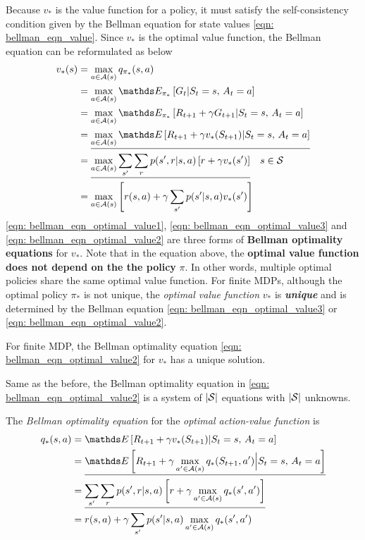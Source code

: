 \documentclass[11pt]{article}
\begin{document}
Because $v_{*}$ is the value function for a policy, it must satisfy the self-consistency condition given by the Bellman equation for state values \eqref{eqn: bellman_eqn_value}. Since $v_{*}$ is the optimal value function, the Bellman equation can be reformulated as below
\begin{align}
v_{*}(s)&= \max_{a\in \cA(s)}q_{\pi_{*}}(s, a) \nonumber\\
&= \max_{a\in \cA(s)}\E{\pi_{*}}{G_{t} | S_{t}=s, \, A_{t}=a} \nonumber\\
&= \max_{a\in \cA(s)}\E{\pi_{*}}{R_{t+1} + \gamma G_{t+1} | S_{t}=s, \, A_{t}=a} \nonumber\\
&= \underline{\max_{a\in \cA(s)}\E{}{R_{t+1} + \gamma v_{*}(S_{t+1}) | S_{t}=s, \, A_{t}=a}} \label{eqn: bellman_eqn_optimal_value1}\\
&= \underline{\max_{a\in \cA(s)}\sum_{s'}\sum_{r}p(s', r|s, a)\brac{r + \gamma v_{*}(s')}} \quad s\in \cS \label{eqn: bellman_eqn_optimal_value2}\\
&= \max_{a\in \cA(s)}\brac{r(s, a) + \gamma \sum_{s'}p(s'|s, a)v_{*}(s')} \label{eqn: bellman_eqn_optimal_value3}
\end{align}  \eqref{eqn: bellman_eqn_optimal_value1}, \eqref{eqn: bellman_eqn_optimal_value3} and  \eqref{eqn: bellman_eqn_optimal_value2} are three forms of \textbf{Bellman optimality equations} for $v_{*}$. Note that in the equation above, the \textbf{optimal value function does not depend on the the policy} $\pi$. In other words, multiple optimal policies share the same optimal value function. For finite MDPs, although the optimal policy $\pi_{*}$ is not unique, the \emph{optimal value function} $v_{*}$ is \emph{\textbf{unique}} and is determined by the Bellman equation  \eqref{eqn: bellman_eqn_optimal_value3} or \eqref{eqn: bellman_eqn_optimal_value2}.

\begin{theorem}
For finite MDP, the Bellman optimality equation \eqref{eqn: bellman_eqn_optimal_value2} for $v_{*}$ has a unique solution. 
\end{theorem} Same as the before, the Bellman optimality equation in \eqref{eqn: bellman_eqn_optimal_value2} is a system of $|{\mathcal S}|$ equations with $|{\mathcal S}|$ unknowns. 

The \emph{Bellman optimality equation} for the \emph{optimal action-value function} is 
\begin{align}
q_{*}(s, a) &=  \E{}{R_{t+1} + \gamma v_{*}(S_{t+1}) | S_{t} = s, \, A_{t} = a} \nonumber\\
&=\underline{\E{}{R_{t+1} + \gamma  \max_{a'\in \cA(s)}q_{*}(S_{t+1}, a')  \Big| S_{t} = s, \, A_{t} = a}}  \label{eqn: bellman_eqn_optimal_value_action3}\\
&= \underline{\sum_{s'}\sum_{r}p(s', r|s, a)\brac{r + \gamma  \max_{a'\in \cA(s)}q_{*}(s', a')}} \label{eqn: bellman_eqn_optimal_value_action} \\
&= r(s, a) +  \gamma \sum_{s'}p(s'| s, a)\max_{a' \in \cA(s)}q_{*}(s', a') \label{eqn: bellman_eqn_optimal_value_action2}
\end{align}
\end{document}

